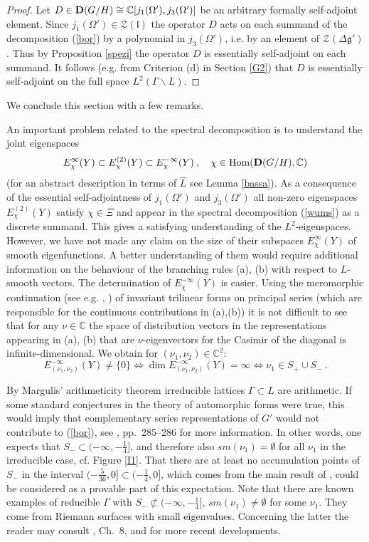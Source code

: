 \documentclass[10]{amsart}
\theoremstyle{remark}
\theoremstyle{definition}
\numberwithin{equation}{section}
\newcommand{\C}{\mathbb{C}}           %
\newcommand{\Hom}{\mathrm{Hom}}
\newcommand{\fg}{{\mathfrak g}}
\newcommand{\fl}{{\mathfrak l}}
\newcommand{\Cal}{\mathcal}
\begin{document}
{\begin{proof}
Let $D\in {\bf D}(G/H)\cong \C[j_1(\Omega'),j_3(\Omega')]$ be an arbitrary formally self-adjoint element. Since $j_1(\Omega')\in {\Cal Z}(\fl)$ the operator $D$ acts on each
summand of the decomposition (\ref{bor}) by a polynomial in $j_3(\Omega')$, i.e. by an element of ${\Cal Z}(\Delta\fg')$. Thus by Proposition \ref{spezi} the operator $D$
is essentially self-adjoint on each summand. It follows (e.g. from Criterion (d) in Section \ref{G2}) that $D$ is essentially self-adjoint on the full space $L^2(\Gamma\backslash L)$.
\end{proof}

We conclude this section with a few remarks.

An important problem related to the spectral decomposition is to understand the joint eigenspaces
$$ E^{\infty}_\chi(Y)\subset E^{(2)}_\chi(Y)\subset E^{-\infty}_\chi(Y)\: ,\quad\chi\in\Hom({\bf D}(G/H),\C)$$
(for an abstract description in terms of $\widehat L$ see Lemma \ref{bassa}).
As a consequence of the essential self-adjointness of $j_1(\Omega')$ and $j_3(\Omega')$ all non-zero eigenspaces $E^{(2)}_\chi(Y)$ satisfy $\chi\in\Xi$ and appear in
the spectral decomposition (\ref{wums}) as a discrete summand. This gives a satisfying understanding of the $L^2$-eigenspaces. However, we have not made any claim on the size of their subspaces $E^{\infty}_\chi(Y)$ of smooth eigenfunctions.
A better understanding of them would require additional information on the behaviour of the branching rules (a), (b) with respect to $L$-smooth vectors. The determination of   $E^{-\infty}_\chi(Y)$ is easier.
Using the meromorphic continuation (see e.g. \cite{BSKZ14}, \cite{Mol17}) of invariant trilinear forms on principal series (which are responsible for the continuous contributions in (a),(b)) it is not difficult to see that for any $\nu\in \C$ the space of distribution vectors in the representations appearing in (a), (b) that are $\nu$-eigenvectors for the Casimir of the diagonal is infinite-dimensional.
We obtain for $(\nu_1,\nu_2)\in\C^2$:
$$ E^{-\infty}_{(\nu_1,\nu_2)}(Y)\ne \{0\} \Leftrightarrow \dim E^{-\infty}_{(\nu_1,\nu_2)}(Y)=\infty \Leftrightarrow \nu_1\in S_+\cup S_-\ .$$ 

By Margulis' arithmeticity theorem irreducible lattices $\Gamma\subset L$ are arithmetic. If some standard conjectures in the theory of automorphic forms were true, this would imply
that complementary series representations of $G'$ would not contribute to (\ref{bor}), see \cite{KSa09}, pp.~285--286 for more information. In other words, one expects that 
$S_-\subset (-\infty,-\frac{1}{4}]$,
and therefore also $sm(\nu_1)=\emptyset$ for all $\nu_1$ in the irreducible case, cf. Figure \ref{I1}. That there are at least no accumulation points of $S_-$ in the interval 
$(-\frac{5}{36},0]\subset (-\frac{1}{4},0]$, which comes from
the main result of \cite{KSa09}, could be considered as a provable part of this expectation. Note that there are known examples of reducible $\Gamma$ with  
$S_-\not\subset (-\infty,-\frac{1}{4}]$,  $sm(\nu_1)\not =\emptyset$ for some $\nu_1$. They come from Riemann surfaces with small eigenvalues. Concerning the latter the reader may
consult \cite{Buser}, Ch.~8, and \cite{BMM18} for more recent developments.

}
\end{document}
